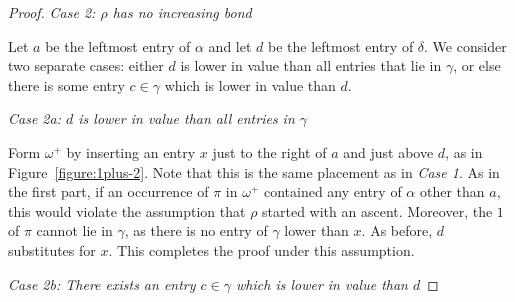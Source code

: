 \documentclass[10pt]{article}
\theoremstyle{plain}
\begin{document}
\begin{proof}
	\bigskip
	
	\emph{Case 2: $\rho$ has no increasing bond}
	
	Let $a$ be the leftmost entry of $\alpha$ and let $d$ be the leftmost entry of $\delta$. We consider two separate cases: either $d$ is lower in value than all entries that lie in $\gamma$, or else there is some entry $c \in \gamma$ which is lower in value than $d$.
	
	\smallskip
	
	\emph{Case 2a:  $d$ is lower in value than all entries in $\gamma$}
	
	Form $\omega^+$ by inserting an entry $x$ just to the right of $a$ and just above $d$, as in Figure~\ref{figure:1plus-2}. Note that this is the same placement as in \emph{Case 1}. As in the first part, if an occurrence of $\pi$ in $\omega^+$ contained any entry of $\alpha$ other than $a$, this would violate the assumption that $\rho$ started with an ascent. Moreover, the $1$ of $\pi$ cannot lie in $\gamma$, as there is no entry of $\gamma$ lower than $x$. As before, $d$ substitutes for $x$. This completes the proof under this assumption.
	
	\emph{Case 2b:  There exists an entry $c \in \gamma$ which is lower in value than $d$}
	

\end{proof}
\end{document}
